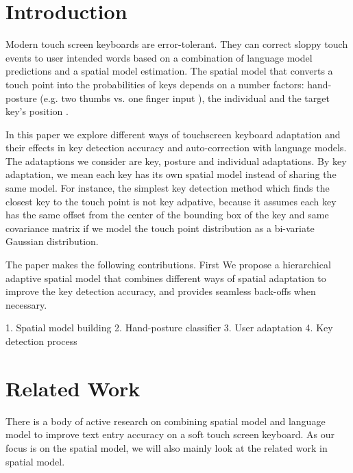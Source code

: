 \documentclass{sigchi}
\begin{document}

\section{Introduction}
Modern touch screen keyboards are error-tolerant. They can correct sloppy touch
events to user intended words based on a combination of language model predictions and a spatial model estimation. 
The spatial model that converts a touch point into the probabilities of keys 
depends on a number factors: hand-posture (e.g. two thumbs vs. one finger input \cite{Azenkot:2012}), 
the individual \cite{Findlater:2012} and the target key's position \cite{Azenkot:2012}.

In this paper we explore different ways of touchscreen keyboard adaptation and
their effects in key detection accuracy and auto-correction with language
models. The adataptions we consider are key, posture and individual adaptations. By key adaptation,
we mean each key has its own spatial model instead of sharing the same model. For instance, 
the simplest key detection method which finds the closest key to the touch point is not key adpative,
because it assumes each key has the same offset from the center of the bounding box 
of the key and same covariance matrix if
we model the touch point distribution as a bi-variate Gaussian distribution.  

The paper makes the following contributions. First
We propose a hierarchical adaptive spatial model that combines different
ways of spatial adaptation to improve the key detection accuracy, and provides seamless back-offs when necessary.

 1. Spatial model building
2. Hand-posture classifier
3. User adaptation
4. Key detection process

\section{Related Work}
There is a body of active research on combining spatial model and language model
to improve text entry accuracy on a soft touch screen keyboard. As our focus is on the 
spatial model, we will also mainly look at the related work in spatial model.    
\end{document}
